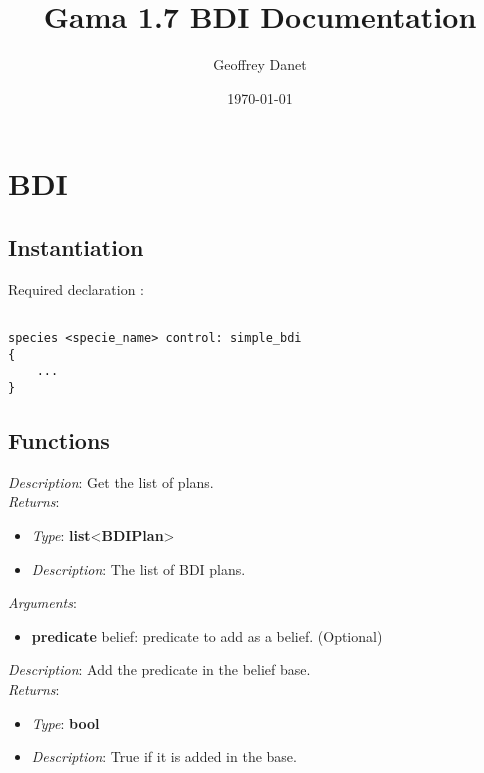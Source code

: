 \documentclass[a4paper]{article}
\title{Gama 1.7 BDI Documentation}
\author{Geoffrey Danet}
\date{\today}
\newenvironment{blueblock}[1]{%
    \tcolorbox[beamer,%
    noparskip,breakable,
    colback=LightBlue,colframe=DarkBlue,%
    colbacklower=DarkBlue!75!LightBlue,%
    title=#1]}%
    {\endtcolorbox}
\begin{document}
	\maketitle

	\section{BDI}
        \subsection{Instantiation}
        Required declaration :
        \lstset{language=Java}          %
        \begin{lstlisting}[frame=single]  % Start your code-block

species <specie_name> control: simple_bdi
{
    ...
}
        \end{lstlisting}
        \subsection{Functions}
            \begin{blueblock}{get\_plans()}
                \textit{Description}: Get the list of plans. \\
                \textit{Returns}:
                \begin{itemize}
                    \item \textit{Type}: \textbf{list}<\textbf{BDIPlan}>
                    \item \textit{Description}: The list of BDI plans.
                \end{itemize}
            \end{blueblock}

            \begin{blueblock}{add\_belief(belief)}
                \textit{Arguments}:
                \begin{itemize}
                    \item \textbf{predicate} belief: predicate to add as a belief. (Optional)
                \end{itemize}
                \textit{Description}: Add the predicate in the belief base. \\
                \textit{Returns}:
                \begin{itemize}
                    \item \textit{Type}: \textbf{bool}
                    \item \textit{Description}: True if it is added in the base.
                \end{itemize}
            \end{blueblock}
\end{document}
